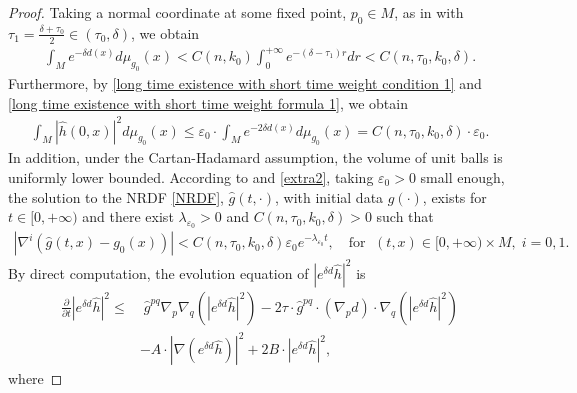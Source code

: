 \documentclass[12pt]{amsart}
\begin{document}
\begin{proof}
    Taking a normal coordinate at some fixed point, $p_0 \in M$, as in  with $\tau_1 = \frac{\delta + \tau_0}{2} \in (\tau_0, \delta)$, we obtain
    \begin{align}\label{long time existence with short time weight formula 1}
        \int_{M} e^{-\delta d(x)} d\mu_{g_0}(x) < C(n, k_0)\int_{0}^{+\infty} e^{-(\delta - \tau_1)r}dr < C(n, \tau_0, k_0, \delta).
    \end{align}
    Furthermore, by \eqref{long time existence with short time weight condition 1} and \eqref{long time existence with short time weight formula 1}, we obtain 
    \begin{align}\label{long time existence with short time weight formula 2}
        \int_M |\hat{h}(0, x)|^2 d\mu_{g_0}(x) \leq \varepsilon_0 \cdot \int_M e^{-2\delta d(x)} d\mu_{g_0}(x) = C(n, \tau_0, k_0, \delta)\cdot \varepsilon_0.
    \end{align}
    In addition, under the Cartan-Hadamard assumption, the volume of unit balls is uniformly lower bounded. According to  and \eqref{extra2}, taking $\varepsilon_0 > 0$ small enough, the solution to the NRDF \eqref{NRDF}, $\hat{g}(t, \cdot)$, with initial data $g(\cdot)$, exists for $t\in [0, +\infty)$ and there exist $\lambda_{\varepsilon_0} > 0$ and $C(n, \tau_0, k_0, \delta) > 0$ such that 
    \begin{align}\label{long time existence with short time weight formula 3}
        |\nabla^{i}(\hat{g}(t, x) - g_0(x))| < C(n, \tau_0, k_0, \delta)\varepsilon_0 e^{-\lambda_{\varepsilon_0} t}, \quad \text{for }\; (t, x)\in [0, +\infty)\times M,\; i = 0, 1. 
    \end{align}
    By direct computation, the evolution equation of $|e^{\delta d}\hat{h}|^2$ is
    \begin{equation}\label{long time existence with short time weight formula 4}
        \begin{split}
        \frac{\partial}{\partial t} |e^{\delta d}\hat{h}|^2 
        \leq&\; \hat{g}^{pq} \nabla_p \nabla_q \left(  |e^{\delta d} \hat{h}|^2 \right) - 2 \tau \cdot \hat{g}^{pq} \cdot (\nabla_p d) \cdot \nabla_q  \left( |e^{\delta d}\hat{h}|^2 \right)\\
        &- A\cdot|\nabla (e^{\delta d}\hat{h})|^2 + 2B\cdot |e^{\delta d}\hat{h}|^2,
        \end{split}
    \end{equation}
    where

\end{proof}
\end{document}
